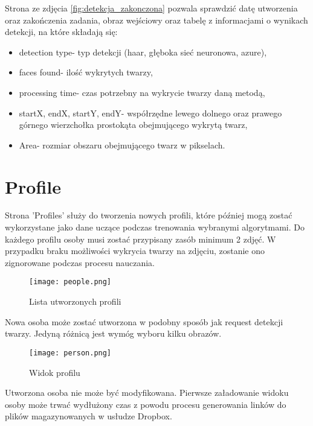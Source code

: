 \pagebreak

Strona ze zdjęcia \ref{fig:detekcja_zakonczona} pozwala sprawdzić datę utworzenia oraz zakończenia zadania, obraz wejściowy oraz tabelę z informacjami o wynikach detekcji, na które składają się:
\begin{itemize}
\item detection type- typ detekcji (haar, głęboka sieć neuronowa, azure),
\item faces found- ilość wykrytych twarzy,
\item processing time- czas potrzebny na wykrycie twarzy daną metodą,
\item startX, endX, startY, endY- współrzędne lewego dolnego oraz prawego górnego wierzchołka prostokąta obejmującego wykrytą twarz,
\item Area- rozmiar obszaru obejmującego twarz w pikselach.
\end{itemize}

\section{Profile}
Strona 'Profiles' służy do tworzenia nowych profili, które później mogą zostać wykorzystane jako dane uczące podczas trenowania wybranymi algorytmami. Do każdego profilu osoby musi zostać przypisany zasób minimum 2 zdjęć. W przypadku braku możliwości wykrycia twarzy na zdjęciu, zostanie ono zignorowane podczas procesu nauczania.
\begin{figure}[H]
	\centering
	\texttt{[image: people.png]}
	\caption{Lista utworzonych profili}
	\label{fig:people}
\end{figure}
Nowa osoba może zostać utworzona w podobny sposób jak request detekcji twarzy. Jedyną różnicą jest wymóg wyboru kilku obrazów.
\begin{figure}[H]
	\centering
	\texttt{[image: person.png]}
	\caption{Widok profilu}
	\label{fig:person}
\end{figure}
Utworzona osoba nie może być modyfikowana. Pierwsze załadowanie widoku osoby może trwać wydłużony czas z powodu procesu generowania linków do plików magazynowanych w usłudze Dropbox.

